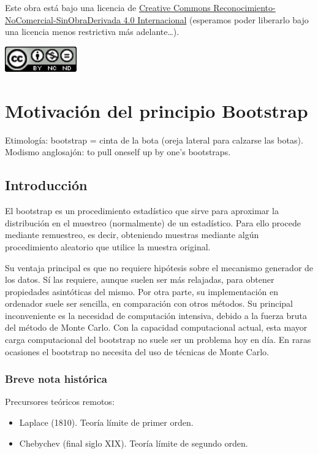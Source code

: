 \documentclass[]{book}
\theoremstyle{definition}
\theoremstyle{definition}
\theoremstyle{definition}
\theoremstyle{remark}
\begin{document}
Este obra está bajo una licencia de
\href{https://creativecommons.org/licenses/by-nc-nd/4.0/deed.es_ES}{Creative
Commons Reconocimiento-NoComercial-SinObraDerivada 4.0 Internacional}
(esperamos poder liberarlo bajo una licencia menos restrictiva más
adelante\ldots{}).

\includegraphics[width=1.22in]{images/by-nc-nd-88x31}

\chapter{Motivación del principio Bootstrap}\label{cap1}

Etimología: bootstrap = cinta de la bota (oreja lateral para calzarse
las botas). Modismo anglosajón: to pull oneself up by one's bootstraps.

\section{Introducción}\label{introduccion}

El bootstrap es un procedimiento estadístico que sirve para aproximar la
distribución en el muestreo (normalmente) de un estadístico. Para ello
procede mediante remuestreo, es decir, obteniendo muestras mediante
algún procedimiento aleatorio que utilice la muestra original.

Su ventaja principal es que no requiere hipótesis sobre el mecanismo
generador de los datos. Sí las requiere, aunque suelen ser más
relajadas, para obtener propiedades asintóticas del mismo. Por otra
parte, su implementación en ordenador suele ser sencilla, en comparación
con otros métodos. Su principal inconveniente es la necesidad de
computación intensiva, debido a la fuerza bruta del método de Monte
Carlo. Con la capacidad computacional actual, esta mayor carga
computacional del bootstrap no suele ser un problema hoy en día. En
raras ocasiones el bootstrap no necesita del uso de técnicas de Monte
Carlo.

\subsection{Breve nota histórica}\label{breve-nota-historica}

Precursores teóricos remotos:

\begin{itemize}
\item
  Laplace (1810). Teoría límite de primer orden.
\item
  Chebychev (final siglo XIX). Teoría límite de segundo orden.
\end{itemize}
\end{document}
